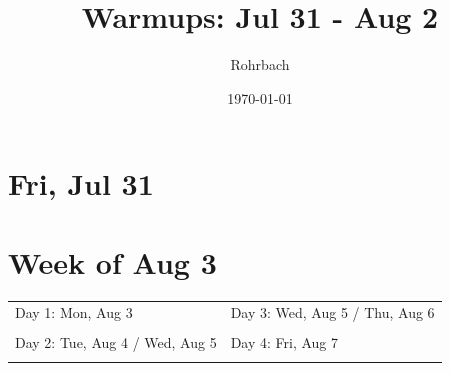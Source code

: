 \documentclass[10pt]{exam}
\title{Warmups: Jul 31 - Aug 2}
\author{Rohrbach}
\date{\today}
\begin{document}
\maketitle



\noindent

\section*{Fri, Jul 31}

\vfill

\section*{Week of Aug 3}
\begin{tabularx}{\textwidth}{X|X}
  \sc Day 1: Mon, Aug 3 & \sc Day 3: Wed, Aug 5 / Thu, Aug 6 \\
  &\\[2.5in] \hline
  \sc Day 2: Tue, Aug 4 / Wed, Aug 5 & \sc Day 4: Fri, Aug 7 \\
  &\\[2.5in] 
\end{tabularx}
\end{document}
